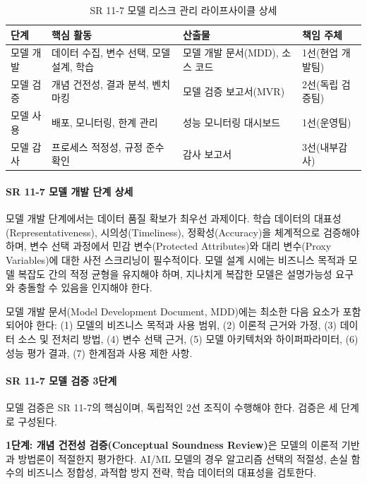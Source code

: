 \begin{table}[htbp]
\centering
\caption{SR 11-7 모델 리스크 관리 라이프사이클 상세}
\label{tab:17_sr117_lifecycle}
\begin{tabularx}{\textwidth}{p{2cm}p{3cm}Xp{3cm}}
\toprule
\textbf{단계} & \textbf{핵심 활동} & \textbf{산출물} & \textbf{책임 주체} \\
\midrule
모델 개발 & 데이터 수집, 변수 선택, 모델 설계, 학습 & 모델 개발 문서(MDD), 소스 코드 & 1선(현업 개발팀) \\
모델 검증 & 개념 건전성, 결과 분석, 벤치마킹 & 모델 검증 보고서(MVR) & 2선(독립 검증팀) \\
모델 사용 & 배포, 모니터링, 한계 관리 & 성능 모니터링 대시보드 & 1선(운영팀) \\
모델 감사 & 프로세스 적정성, 규정 준수 확인 & 감사 보고서 & 3선(내부감사) \\
\bottomrule
\end{tabularx}
\end{table}

\paragraph{SR 11-7 모델 개발 단계 상세}

모델 개발 단계에서는 데이터 품질 확보가 최우선 과제이다. 학습 데이터의 대표성(Representativeness), 시의성(Timeliness), 정확성(Accuracy)을 체계적으로 검증해야 하며, 변수 선택 과정에서 민감 변수(Protected Attributes)와 대리 변수(Proxy Variables)에 대한 사전 스크리닝이 필수적이다. 모델 설계 시에는 비즈니스 목적과 모델 복잡도 간의 적정 균형을 유지해야 하며, 지나치게 복잡한 모델은 설명가능성 요구와 충돌할 수 있음을 인지해야 한다.

모델 개발 문서(Model Development Document, MDD)에는 최소한 다음 요소가 포함되어야 한다: (1) 모델의 비즈니스 목적과 사용 범위, (2) 이론적 근거와 가정, (3) 데이터 소스 및 전처리 방법, (4) 변수 선택 근거, (5) 모델 아키텍처와 하이퍼파라미터, (6) 성능 평가 결과, (7) 한계점과 사용 제한 사항.

\paragraph{SR 11-7 모델 검증 3단계}

모델 검증은 SR 11-7의 핵심이며, 독립적인 2선 조직이 수행해야 한다. 검증은 세 단계로 구성된다.

\textbf{1단계: 개념 건전성 검증(Conceptual Soundness Review)}은 모델의 이론적 기반과 방법론이 적절한지 평가한다. AI/ML 모델의 경우 알고리즘 선택의 적절성, 손실 함수의 비즈니스 정합성, 과적합 방지 전략, 학습 데이터의 대표성을 검토한다.

